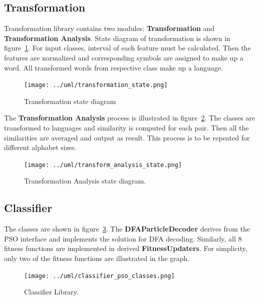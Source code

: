 \documentclass{mini}
\begin{document}
\subsection{Transformation}
Transformation library contains two modules: {\bf Transformation} and {\bf Transformation Analysis}. State diagram of transformation is shown in figure~\ref{fig:transform_state}. For input classes, interval of each feature must be calculated. Then the features are normalized and corresponding symbols are assigned to make up a word. All transformed words from respective class make up a language.


\begin{figure}[H]
    \centering
    \texttt{[image: ../uml/transformation\_state.png]}
    \caption{Transformation state diagram}
    \label{fig:transform_state}
\end{figure}

The {\bf Transformation Analysis} process is illustrated in figure~\ref{fig:transform_analysis_state}. The classes are transformed to languages and similarity is computed for each pair. Then all the similarities are averaged and output as result. This process is to be repeated for different alphabet sizes.

\begin{figure}[H]
    \centering
    \texttt{[image: ../uml/transform\_analysis\_state.png]}
    \caption{Transformation Analysis state diagram.}
    \label{fig:transform_analysis_state}
\end{figure}


\subsection{Classifier}

The classes are shown in figure~\ref{fig:classifier_pso_classes}. The {\bf DFAParticleDecoder} derives from the PSO interface and implements the solution for DFA decoding. Similarly, all 8 fitness functions are implemented in derived {\bf FitnessUpdaters}. For simplicity, only two of the fitness functions are illustrated in the graph.

\begin{figure}[H]
    \centering
    \texttt{[image: ../uml/classifier\_pso\_classes.png]}
    \caption{Classifier Library.}
    \label{fig:classifier_pso_classes}
\end{figure}
\end{document}
